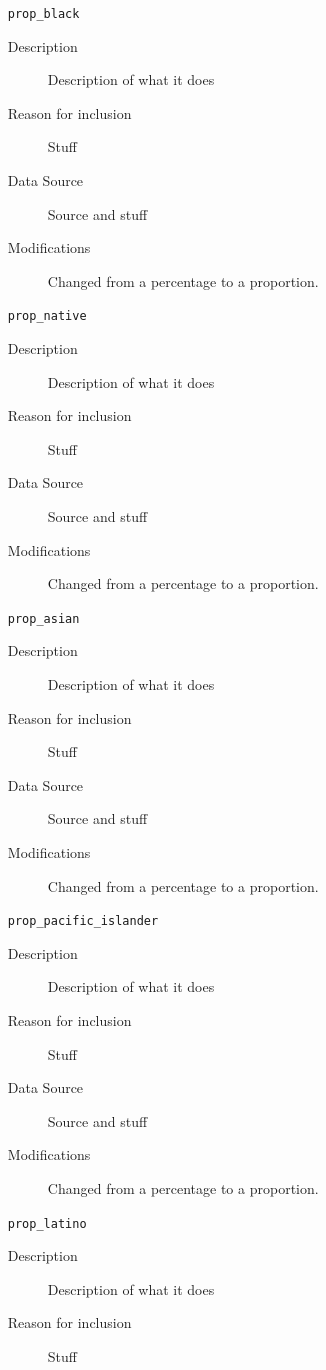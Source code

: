\documentclass{article}
\begin{document}
\begin{itemize}[label={}, align=left]
	\item[\texttt{prop\_black}] \
	      \begin{description}
		      \item[Description] Description of what it does
		      \item[Reason for inclusion] Stuff
		      \item[Data Source] Source and stuff
		      \item[Modifications] Changed from a percentage to a proportion.
	      \end{description}
	\item[\texttt{prop\_native}] \
	      \begin{description}
		      \item[Description] Description of what it does
		      \item[Reason for inclusion] Stuff
		      \item[Data Source] Source and stuff
		      \item[Modifications] Changed from a percentage to a proportion.
	      \end{description}
	\item[\texttt{prop\_asian}] \
	      \begin{description}
		      \item[Description] Description of what it does
		      \item[Reason for inclusion] Stuff
		      \item[Data Source] Source and stuff
		      \item[Modifications] Changed from a percentage to a proportion.
	      \end{description}
	\item[\texttt{prop\_pacific\_islander}] \
	      \begin{description}
		      \item[Description] Description of what it does
		      \item[Reason for inclusion] Stuff
		      \item[Data Source] Source and stuff
		      \item[Modifications] Changed from a percentage to a proportion.
	      \end{description}
	\item[\texttt{prop\_latino}] \
	      \begin{description}
		      \item[Description] Description of what it does
		      \item[Reason for inclusion] Stuff

\end{description}
\end{itemize}
\end{document}
